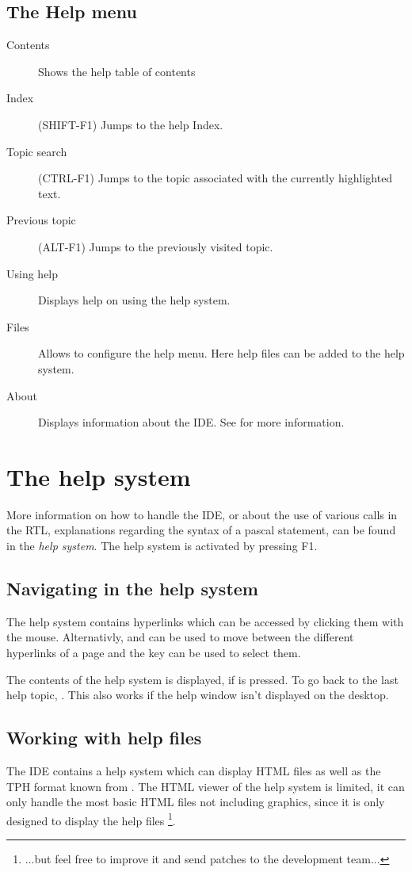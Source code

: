 \subsection{The Help menu}
\label{se:menuhelp}
\begin{description}
\item[Contents]
Shows the help table of contents
\item[Index] (SHIFT-F1)
Jumps to the help Index.
\item[Topic search]  (CTRL-F1)
Jumps to the topic associated with the currently highlighted text.
\item[Previous topic] (ALT-F1)
Jumps to the previously visited topic.
\item[Using help]
Displays help on using the help system.
\item[Files]
Allows to configure the help menu. Here help files can be added to the help
system.
\item[About]
Displays information about the IDE. See  for more information.
\end{description}

\section{The help system}
More information on how to handle the IDE, or about the use of various
calls in the RTL, explanations regarding the syntax of a pascal statement,
can be found in the \emph{help system}. The help system is activated
 by pressing F1.

\subsection{Navigating in the help system}
The help system contains hyperlinks which can be accessed by clicking
them with the mouse. Alternativly,  and 
can be used to move between the different hyperlinks of a page
and the  key can be used to select them.

The contents of the help system is displayed, if  is
pressed. To go back to the last help topic, . 
This also works if the help window isn't displayed on the desktop.

\subsection{Working with help files}
The IDE contains a help system which can display HTML files
as well as the TPH format known from \tp. The HTML viewer of the 
help system is limited, it can only handle the most basic HTML files 
not including graphics, since it is only designed to display the \fpc help 
files \footnote{...but feel free to improve it and send patches to the 
\fpc development team...}.

